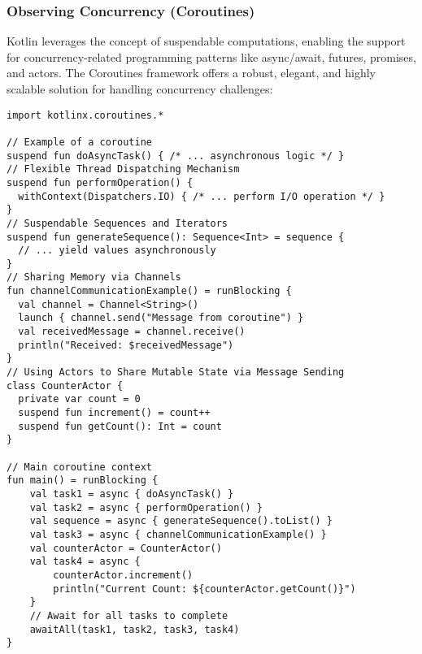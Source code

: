 \subsubsection{Observing Concurrency (Coroutines)}

Kotlin leverages the concept of suspendable computations, enabling the support for concurrency-related programming 
patterns like async/await, futures, promises, and actors. The Coroutines framework \cite{Babi22} offers a robust, 
elegant, and highly scalable solution for handling concurrency challenges:

\begin{lstlisting}
import kotlinx.coroutines.*

// Example of a coroutine
suspend fun doAsyncTask() { /* ... asynchronous logic */ }
// Flexible Thread Dispatching Mechanism
suspend fun performOperation() {
  withContext(Dispatchers.IO) { /* ... perform I/O operation */ }
}
// Suspendable Sequences and Iterators
suspend fun generateSequence(): Sequence<Int> = sequence {
  // ... yield values asynchronously
}
// Sharing Memory via Channels
fun channelCommunicationExample() = runBlocking {
  val channel = Channel<String>()
  launch { channel.send("Message from coroutine") }
  val receivedMessage = channel.receive()
  println("Received: $receivedMessage")
}
// Using Actors to Share Mutable State via Message Sending
class CounterActor {
  private var count = 0
  suspend fun increment() = count++
  suspend fun getCount(): Int = count
}

// Main coroutine context
fun main() = runBlocking {
    val task1 = async { doAsyncTask() }
    val task2 = async { performOperation() }
    val sequence = async { generateSequence().toList() }
    val task3 = async { channelCommunicationExample() }
    val counterActor = CounterActor()
    val task4 = async {
        counterActor.increment()
        println("Current Count: ${counterActor.getCount()}")
    }
    // Await for all tasks to complete
    awaitAll(task1, task2, task3, task4)
}
\end{lstlisting}

